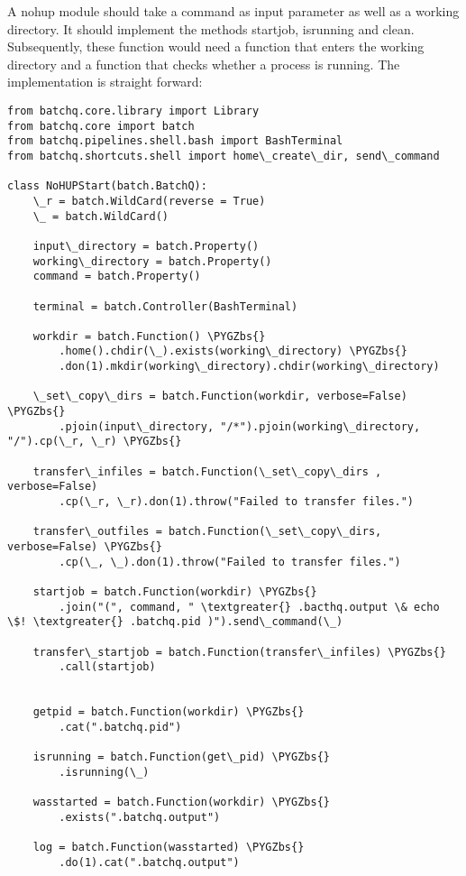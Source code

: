 \documentclass[letterpaper,10pt,english]{sphinxmanual}
\def\PYGZbs{\char`\\}
\begin{document}
A nohup module should take a command as input
parameter as well as a working directory. It should implement the
methods startjob, isrunning and clean. Subsequently, these function
would need a function that enters the working directory and a function
that checks whether a process is running. The implementation is straight
forward:

\begin{Verbatim}[commandchars=\\\{\}]
from batchq.core.library import Library
from batchq.core import batch
from batchq.pipelines.shell.bash import BashTerminal
from batchq.shortcuts.shell import home\_create\_dir, send\_command

class NoHUPStart(batch.BatchQ):
    \_r = batch.WildCard(reverse = True)
    \_ = batch.WildCard()

    input\_directory = batch.Property()
    working\_directory = batch.Property()
    command = batch.Property()

    terminal = batch.Controller(BashTerminal)

    workdir = batch.Function() \PYGZbs{}
        .home().chdir(\_).exists(working\_directory) \PYGZbs{}
        .don(1).mkdir(working\_directory).chdir(working\_directory)

    \_set\_copy\_dirs = batch.Function(workdir, verbose=False) \PYGZbs{}
        .pjoin(input\_directory, "/*").pjoin(working\_directory, "/").cp(\_r, \_r) \PYGZbs{}

    transfer\_infiles = batch.Function(\_set\_copy\_dirs , verbose=False)
        .cp(\_r, \_r).don(1).throw("Failed to transfer files.")

    transfer\_outfiles = batch.Function(\_set\_copy\_dirs, verbose=False) \PYGZbs{}
        .cp(\_, \_).don(1).throw("Failed to transfer files.")

    startjob = batch.Function(workdir) \PYGZbs{}
        .join("(", command, " \textgreater{} .bacthq.output \& echo \$! \textgreater{} .batchq.pid )").send\_command(\_) 

    transfer\_startjob = batch.Function(transfer\_infiles) \PYGZbs{}
        .call(startjob)


    getpid = batch.Function(workdir) \PYGZbs{}
        .cat(".batchq.pid")

    isrunning = batch.Function(get\_pid) \PYGZbs{}
        .isrunning(\_)

    wasstarted = batch.Function(workdir) \PYGZbs{}
        .exists(".batchq.output")

    log = batch.Function(wasstarted) \PYGZbs{}
        .do(1).cat(".batchq.output")


\end{Verbatim}
\end{document}
